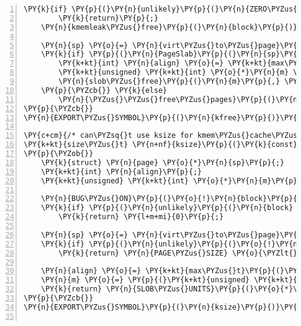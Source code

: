 \begin{Verbatim}[commandchars=\\\{\},numbers=left,firstnumber=1,stepnumber=1]
	\PY{k}{if} \PY{p}{(}\PY{n}{unlikely}\PY{p}{(}\PY{n}{ZERO\PYZus{}OR\PYZus{}NULL\PYZus{}PTR}\PY{p}{(}\PY{n}{block}\PY{p}{)}\PY{p}{)}\PY{p}{)}
		\PY{k}{return}\PY{p}{;}
	\PY{n}{kmemleak\PYZus{}free}\PY{p}{(}\PY{n}{block}\PY{p}{)}\PY{p}{;}

	\PY{n}{sp} \PY{o}{=} \PY{n}{virt\PYZus{}to\PYZus{}page}\PY{p}{(}\PY{n}{block}\PY{p}{)}\PY{p}{;}
	\PY{k}{if} \PY{p}{(}\PY{n}{PageSlab}\PY{p}{(}\PY{n}{sp}\PY{p}{)}\PY{p}{)} \PY{p}{\PYZob{}}
		\PY{k+kt}{int} \PY{n}{align} \PY{o}{=} \PY{k+kt}{max\PYZus{}t}\PY{p}{(}\PY{k+kt}{size\PYZus{}t}\PY{p}{,} \PY{n}{ARCH\PYZus{}KMALLOC\PYZus{}MINALIGN}\PY{p}{,} \PY{n}{ARCH\PYZus{}SLAB\PYZus{}MINALIGN}\PY{p}{)}\PY{p}{;}
		\PY{k+kt}{unsigned} \PY{k+kt}{int} \PY{o}{*}\PY{n}{m} \PY{o}{=} \PY{p}{(}\PY{k+kt}{unsigned} \PY{k+kt}{int} \PY{o}{*}\PY{p}{)}\PY{p}{(}\PY{n}{block} \PY{o}{\PYZhy{}} \PY{n}{align}\PY{p}{)}\PY{p}{;}
		\PY{n}{slob\PYZus{}free}\PY{p}{(}\PY{n}{m}\PY{p}{,} \PY{o}{*}\PY{n}{m} \PY{o}{+} \PY{n}{align}\PY{p}{)}\PY{p}{;}
	\PY{p}{\PYZcb{}} \PY{k}{else}
		\PY{n}{\PYZus{}\PYZus{}free\PYZus{}pages}\PY{p}{(}\PY{n}{sp}\PY{p}{,} \PY{n}{compound\PYZus{}order}\PY{p}{(}\PY{n}{sp}\PY{p}{)}\PY{p}{)}\PY{p}{;}
\PY{p}{\PYZcb{}}
\PY{n}{EXPORT\PYZus{}SYMBOL}\PY{p}{(}\PY{n}{kfree}\PY{p}{)}\PY{p}{;}

\PY{c+cm}{/* can\PYZsq{}t use ksize for kmem\PYZus{}cache\PYZus{}alloc memory, only kmalloc */}
\PY{k+kt}{size\PYZus{}t} \PY{n+nf}{ksize}\PY{p}{(}\PY{k}{const} \PY{k+kt}{void} \PY{o}{*}\PY{n}{block}\PY{p}{)}
\PY{p}{\PYZob{}}
	\PY{k}{struct} \PY{n}{page} \PY{o}{*}\PY{n}{sp}\PY{p}{;}
	\PY{k+kt}{int} \PY{n}{align}\PY{p}{;}
	\PY{k+kt}{unsigned} \PY{k+kt}{int} \PY{o}{*}\PY{n}{m}\PY{p}{;}

	\PY{n}{BUG\PYZus{}ON}\PY{p}{(}\PY{o}{!}\PY{n}{block}\PY{p}{)}\PY{p}{;}
	\PY{k}{if} \PY{p}{(}\PY{n}{unlikely}\PY{p}{(}\PY{n}{block} \PY{o}{=}\PY{o}{=} \PY{n}{ZERO\PYZus{}SIZE\PYZus{}PTR}\PY{p}{)}\PY{p}{)}
		\PY{k}{return} \PY{l+m+mi}{0}\PY{p}{;}

	\PY{n}{sp} \PY{o}{=} \PY{n}{virt\PYZus{}to\PYZus{}page}\PY{p}{(}\PY{n}{block}\PY{p}{)}\PY{p}{;}
	\PY{k}{if} \PY{p}{(}\PY{n}{unlikely}\PY{p}{(}\PY{o}{!}\PY{n}{PageSlab}\PY{p}{(}\PY{n}{sp}\PY{p}{)}\PY{p}{)}\PY{p}{)}
		\PY{k}{return} \PY{n}{PAGE\PYZus{}SIZE} \PY{o}{\PYZlt{}}\PY{o}{\PYZlt{}} \PY{n}{compound\PYZus{}order}\PY{p}{(}\PY{n}{sp}\PY{p}{)}\PY{p}{;}

	\PY{n}{align} \PY{o}{=} \PY{k+kt}{max\PYZus{}t}\PY{p}{(}\PY{k+kt}{size\PYZus{}t}\PY{p}{,} \PY{n}{ARCH\PYZus{}KMALLOC\PYZus{}MINALIGN}\PY{p}{,} \PY{n}{ARCH\PYZus{}SLAB\PYZus{}MINALIGN}\PY{p}{)}\PY{p}{;}
	\PY{n}{m} \PY{o}{=} \PY{p}{(}\PY{k+kt}{unsigned} \PY{k+kt}{int} \PY{o}{*}\PY{p}{)}\PY{p}{(}\PY{n}{block} \PY{o}{\PYZhy{}} \PY{n}{align}\PY{p}{)}\PY{p}{;}
	\PY{k}{return} \PY{n}{SLOB\PYZus{}UNITS}\PY{p}{(}\PY{o}{*}\PY{n}{m}\PY{p}{)} \PY{o}{*} \PY{n}{SLOB\PYZus{}UNIT}\PY{p}{;}
\PY{p}{\PYZcb{}}
\PY{n}{EXPORT\PYZus{}SYMBOL}\PY{p}{(}\PY{n}{ksize}\PY{p}{)}\PY{p}{;}


\end{Verbatim}
